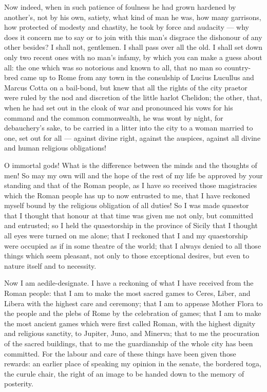  Now indeed, when in such patience of foulness he had grown hardened by another's, not by his own, satiety, what kind of man he was, how many garrisons, how protected of modesty and chastity, he took by force and audacity --- why does it concern me to say or to join with this man's disgrace the dishonour of any other besides? I shall not, gentlemen. I shall pass over all the old. I shall set down only two recent ones with no man's infamy, by which you can make a guess about all: the one which was so notorious and known to all, that no man so country-bred came up to Rome from any town in the consulship of Lucius Lucullus and Marcus Cotta on a bail-bond, but knew that all the rights of the city praetor were ruled by the nod and discretion of the little harlot Chelidon; the other, that, when he had set out in the cloak of war and pronounced his vows for his command and the common commonwealth, he was wont by night, for debauchery's sake, to be carried in a litter into the city to a woman married to one, set out for all --- against divine right, against the auspices, against all divine and human religious obligations!

 O immortal gods! What is the difference between the minds and the thoughts of men! So may my own will and the hope of the rest of my life be approved by your standing and that of the Roman people, as I have so received those magistracies which the Roman people has up to now entrusted to me, that I have reckoned myself bound by the religious obligation of all duties! So I was made quaestor that I thought that honour at that time was given me not only, but committed and entrusted; so I held the quaestorship in the province of Sicily that I thought all eyes were turned on me alone; that I reckoned that I and my quaestorship were occupied as if in some theatre of the world; that I always denied to all those things which seem pleasant, not only to those exceptional desires, but even to nature itself and to necessity.

 Now I am aedile-designate. I have a reckoning of what I have received from the Roman people: that I am to make the most sacred games to Ceres, Liber, and Libera with the highest care and ceremony; that I am to appease Mother Flora to the people and the plebs of Rome by the celebration of games; that I am to make the most ancient games which were first called Roman, with the highest dignity and religious sanctity, to Jupiter, Juno, and Minerva; that to me the procuration of the sacred buildings, that to me the guardianship of the whole city has been committed. For the labour and care of these things have been given those rewards: an earlier place of speaking my opinion in the senate, the bordered toga, the curule chair, the right of an image to be handed down to the memory of posterity.

